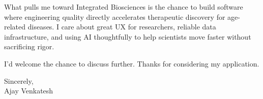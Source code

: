 \documentclass[letterpaper,11pt]{article}
\begin{document}
What pulls me toward Integrated Biosciences is the chance to build software where engineering quality directly accelerates therapeutic discovery for age-related diseases. I care about great UX for researchers, reliable data infrastructure, and using AI thoughtfully to help scientists move faster without sacrificing rigor.

I'd welcome the chance to discuss further. Thanks for considering my application.

\vspace{12pt}
Sincerely, \\
Ajay Venkatesh
\end{document}
